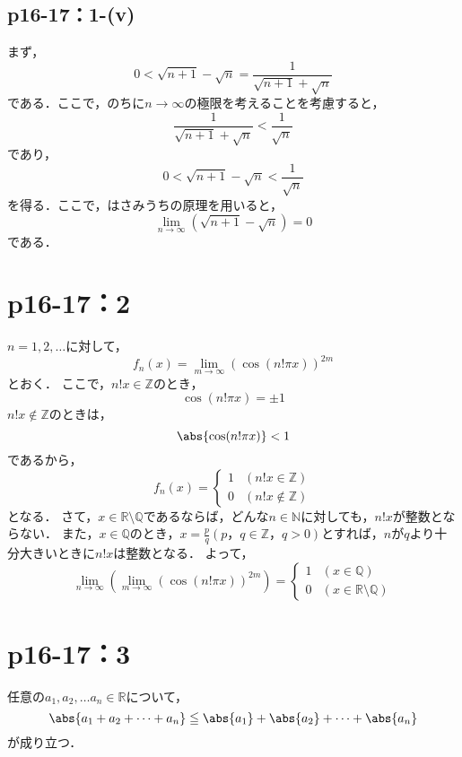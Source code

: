 \documentclass[a4paper,10pt,fleqn]{ltjsarticle}
\begin{document}
\subsection*{p16-17：1-(v)}
\begin{tleftbar}
    まず，
    \[
       0<\sqrt{n+1} - \sqrt{n} = \frac{1}{\sqrt{n+1} + \sqrt{n}}
    \]
    である．ここで，のちに$n \to \infty$の極限を考えることを考慮すると，
    \[
    \frac{1}{\sqrt{n+1} + \sqrt{n}} < \frac{1}{\sqrt{n}} 
    \]
    であり，
    \[
        0< \sqrt{n+1} - \sqrt{n} <\frac{1}{\sqrt{n}}
    \]
    を得る．ここで，はさみうちの原理を用いると，
    \[
        \lim_{n \to \infty} (\sqrt{n+1} - \sqrt{n} )=0
    \]
    である．
\end{tleftbar}

\section*{p16-17：2}

$n=1,2,\ldots$に対して，
\[
	f_{n} (x)=\lim_{m \to \infty} (\cos (n! \pi x)) ^{2m}
\]
とおく．
ここで，$n!x \in \mathbb{Z}$のとき，
\[
	\cos (n! \pi x)=\pm 1
\]
$n!x \notin \mathbb{Z}$のときは，
\[
	\abs{\cos (n! \pi x)}<1
\]
であるから，
\[
	f_{n} (x)=
	\begin{cases}
		1 &(n!x \in \mathbb{Z}) \\
		0 & (n!x \notin \mathbb{Z})
	\end{cases}
\]
となる．
さて，$x \in \mathbb{R} \setminus \mathbb{Q}$であるならば，どんな$n \in \mathbb{N}$に対しても，$n! x$が整数とならない．
また，$x \in \mathbb{Q}$のとき，$ x=\frac{p}{q}(p，q \in \mathbb{Z}，q>0)$とすれば，$n$が$q$より十分大きいときに$n!x$は整数となる．
よって，
\[
	\lim_{n \to \infty} \left( \lim_{m \to \infty} (\cos (n! \pi x)) ^{2m} \right)=
	\begin{cases}
		1 &(x \in \mathbb{Q}) \\
		0 & (x \in \mathbb{R} \setminus \mathbb{Q})
	\end{cases}
\]


\section*{p16-17：3}


    任意の$a_1 , a_2 , \dots a_n \in \mathbb{R}$について，
    \[
        \abs{a_1+a_2+\dots+a_n} \leqq \abs{a_1}+\abs{a_2}+\dots+\abs{a_n}
    \]
    が成り立つ．
\end{document}
